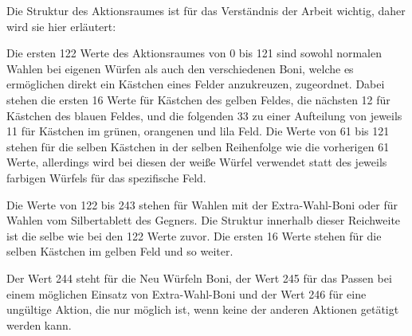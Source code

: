 Die Struktur des Aktionsraumes ist für das Verständnis der Arbeit wichtig, daher wird sie hier erläutert:

Die ersten 122 Werte des Aktionsraumes von 0 bis 121 sind sowohl normalen Wahlen bei eigenen Würfen als auch den verschiedenen Boni, welche es ermöglichen direkt ein Kästchen eines Felder anzukreuzen, zugeordnet. Dabei stehen die ersten 16 Werte für Kästchen des gelben Feldes, die nächsten 12 für Kästchen des blauen Feldes, und die folgenden 33 zu einer Aufteilung von jeweils 11 für Kästchen im grünen, orangenen und lila Feld. Die Werte von 61 bis 121 stehen für die selben Kästchen in der selben Reihenfolge wie die vorherigen 61 Werte, allerdings wird bei diesen der weiße Würfel verwendet statt des jeweils farbigen Würfels für das spezifische Feld.

Die Werte von 122 bis 243 stehen für Wahlen mit der Extra-Wahl-Boni oder für Wahlen vom Silbertablett des Gegners. Die Struktur innerhalb dieser Reichweite ist die selbe wie bei den 122 Werte zuvor. Die ersten 16 Werte stehen für die selben Kästchen im gelben Feld und so weiter.

Der Wert 244 steht für die Neu Würfeln Boni, der Wert 245 für das Passen bei einem möglichen Einsatz von Extra-Wahl-Boni und der Wert 246 für eine ungültige Aktion, die nur möglich ist, wenn keine der anderen Aktionen getätigt werden kann.

